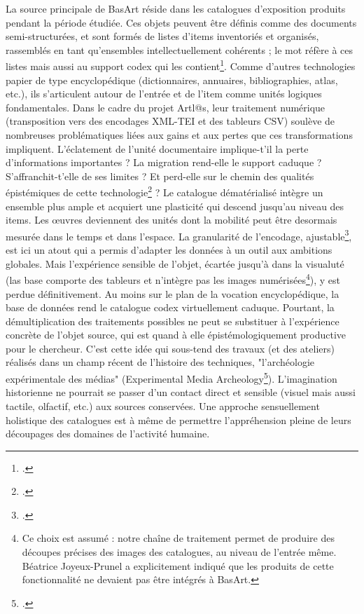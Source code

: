 \documentclass[a4paper,12pt,twoside]{book}
\begin{document}
La source principale de BasArt réside dans les catalogues d'exposition produits pendant la période étudiée. Ces objets peuvent être définis comme des documents semi-structurées, et sont formés de listes d'items inventoriés et organisés, rassemblés en tant qu'ensembles intellectuellement cohérents ; le mot réfère à ces listes mais aussi au support codex qui les contient\footcite{chante_notion_2013, barbier_argile_2015}. Comme d'autres technologies papier de type encyclopédique (dictionnaires, annuaires, bibliographies, atlas, etc.), ils s'articulent autour de l'entrée et de l'item comme unités logiques fondamentales. Dans le cadre du projet Artl@s, leur traitement numérique (transposition vers des encodages XML-TEI et des tableurs CSV) soulève de nombreuses problématiques liées aux gains et aux pertes que ces transformations impliquent. L'éclatement de l'unité documentaire implique-t'il la perte d'informations importantes ? La migration rend-elle le support caduque ? S'affranchit-t'elle de ses limites ? Et perd-elle sur le chemin des qualités épistémiques de cette technologie\footcite{latourCesReseauxQue1996, dastonObjectivity2007} ? Le catalogue dématérialisé intègre un ensemble plus ample et acquiert une plasticité qui descend jusqu'au niveau des items. Les œuvres deviennent des unités dont la mobilité peut être desormais mesurée dans le temps et dans l'espace. La granularité de l'encodage, ajustable\footcite{gefenEnjeuxEpistemologiquesHumanites2015}, est ici un atout qui a permis d'adapter les données à un outil aux ambitions globales. Mais l'expérience sensible de l'objet, écartée jusqu'à dans la visualuté (las base comporte des tableurs et n'intègre pas les images numérisées\footnote{Ce choix est assumé : notre chaîne de traitement permet de produire des découpes précises des images des catalogues, au niveau de l'entrée même. Béatrice Joyeux-Prunel a explicitement indiqué que les produits de cette fonctionnalité ne devaient pas être intégrés à BasArt.}), y est perdue définitivement. Au moins sur le plan de la vocation encyclopédique, la base de données rend le catalogue codex virtuellement caduque. Pourtant, la démultiplication des traitements possibles ne peut se substituer à l'expérience concrète de l'objet source, qui est quand à elle épistémologiquement productive pour le chercheur. C'est cette idée qui sous-tend des travaux (et des ateliers) réalisés dans un champ récent de l'histoire des techniques, "l'archéologie expérimentale des médias" (Experimental Media Archeology\footcite{fickersExperimentalMediaArchaeology}). L'imagination historienne ne pourrait se passer d'un contact direct et sensible (visuel mais aussi tactile, olfactif, etc.) aux sources conservées. Une approche sensuellement holistique des catalogues est à même de permettre l'appréhension pleine de leurs découpages des domaines de l'activité humaine.
\end{document}
